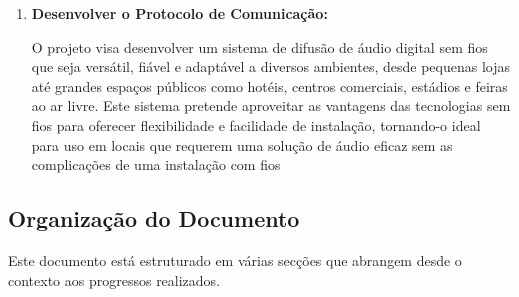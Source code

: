 \documentclass{article}
\begin{document}
\begin{enumerate}
\vspace{0.2cm}

\item \textbf{Desenvolver o Protocolo de Comunicação:}

\begin{adjustwidth}{0.1cm}{0.1cm}
O projeto visa desenvolver um sistema de difusão de áudio digital sem fios que seja versátil, fiável e adaptável a diversos ambientes, desde pequenas lojas até grandes espaços públicos como hotéis, centros comerciais, estádios e feiras ao ar livre. Este sistema pretende aproveitar as vantagens das tecnologias sem fios para oferecer flexibilidade e facilidade de instalação, tornando-o ideal para uso em locais que requerem uma solução de áudio eficaz sem as complicações de uma instalação com fios
\end{adjustwidth}

\end{enumerate}

\newpage

\subsection{Organização do Documento}

\vspace{0.5cm}

Este documento está estruturado em várias secções que abrangem desde o contexto aos progressos realizados. 
\end{document}
